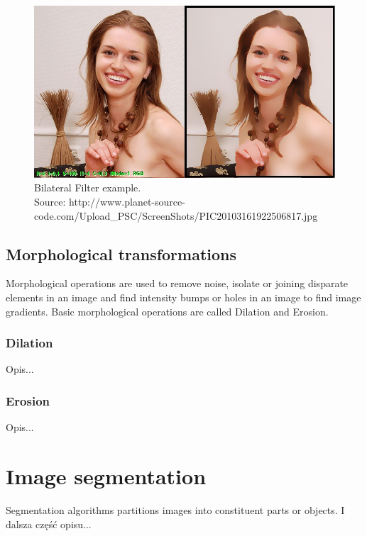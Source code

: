 \documentclass[a4paper,onecolumn,oneside,12pt]{memoir}
\begin{document}
\begin{figure}[ht]
\begin{center}
\includegraphics[scale=0.6]{images/BilateralFilterExample.jpg}
\caption{Bilateral Filter example. \\
Source: http://www.planet-source-code.com/Upload\_PSC/ScreenShots/PIC20103161922506817.jpg}
\label{bilateralFilterExample}
\end{center}
\end{figure}

\subsection{Morphological transformations}

Morphological operations are used to remove noise, isolate or joining disparate elements
in an image and find intensity bumps or holes in an image to find image gradients. Basic 
morphological operations are called Dilation and Erosion.

\subsubsection{Dilation}

Opis...

\subsubsection{Erosion}

Opis...

\section{Image segmentation}

Segmentation algorithms partitions images into constituent parts or objects. I dalsza część opisu...
\end{document}
